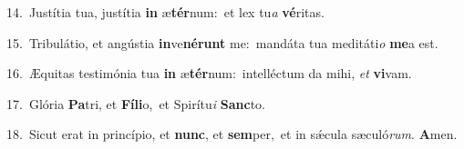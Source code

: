 {\numbfont\textcolor{\numbcolor}{14.}}~Justítia tua, justítia \textbf{in} æ\-\textbf{tér}\-num:~\star et lex tu\textit{a} \textbf{vé}\-ritas.\par
{\numbfont\textcolor{\numbcolor}{15.}}~Tribulátio, et angústia \textbf{in}\-ve\-\textbf{né}\-\textbf{runt} me:~\star mandáta tua meditáti\textit{o} \textbf{me}\-a est.\par
{\numbfont\textcolor{\numbcolor}{16.}}~Æquitas testimónia tua \textbf{in} æ\-\textbf{tér}\-num:~\star intelléctum da mihi, \textit{et} \textbf{vi}\-vam.\par
{\numbfont\textcolor{\numbcolor}{17.}}~Glória \textbf{Pa}\-tri, et \textbf{Fí}\-\textbf{li}o,~\star et Spirítu\textit{i} \textbf{Sanc}\-to.\par
{\numbfont\textcolor{\numbcolor}{18.}}~Sicut erat in princípio, et \textbf{nunc}\-, et \textbf{sem}\-per,~\star et in sǽcula sæculó\-\textit{rum}\-. \textbf{A}\-men.\par
